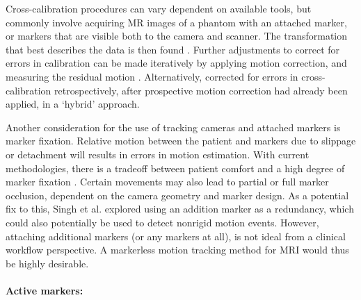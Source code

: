 \documentclass[class=article, crop=false]{standalone}
\begin{document}
\par 
Cross-calibration procedures can vary dependent on available tools, but commonly involve acquiring MR images of a phantom with an attached marker, or markers that are visible both to the camera and scanner. The transformation that best describes the data is then found \parencite{Zahneisen2014,Aksoy2011,Zaitsev2006a}. Further adjustments to correct for errors in calibration can be made iteratively by applying motion correction, and measuring the residual motion \parencite{Zaitsev2006a,Zahneisen2014}. Alternatively, \cite{Aksoy2012} corrected for errors in cross-calibration retrospectively, after prospective motion correction had already been applied, in a `hybrid' approach.
\par
Another consideration for the use of tracking cameras and attached markers is marker fixation. Relative motion between the patient and markers due to slippage or detachment will results in errors in motion estimation. With current methodologies, there is a tradeoff between patient comfort and a high degree of marker fixation \parencite{Maclaren2013}. Certain movements may also lead to partial or full marker occlusion, dependent on the camera geometry and marker design. As a potential fix to this, Singh et al. \parencite*{Singh2015} explored using an addition marker as a redundancy, which could also potentially be used to detect nonrigid motion events. However, attaching additional markers (or any markers at all), is not ideal from a clinical workflow perspective. A markerless motion tracking method for MRI would thus be highly desirable.

\paragraph{Active markers:}
\end{document}
